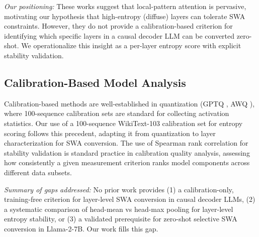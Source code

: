 \textit{Our positioning:} These works suggest that local-pattern attention is pervasive, motivating our hypothesis that high-entropy (diffuse) layers can tolerate SWA constraints. However, they do not provide a calibration-based criterion for identifying which specific layers in a causal decoder LLM can be converted zero-shot. We operationalize this insight as a per-layer entropy score with explicit stability validation.

\subsection{Calibration-Based Model Analysis}

Calibration-based methods are well-established in quantization (GPTQ \cite{Frantar2023GPTQ}, AWQ \cite{Lin2024AWQ}), where 100-sequence calibration sets are standard for collecting activation statistics. Our use of a 100-sequence WikiText-103 calibration set for entropy scoring follows this precedent, adapting it from quantization to layer characterization for SWA conversion. The use of Spearman rank correlation for stability validation is standard practice in calibration quality analysis, assessing how consistently a given measurement criterion ranks model components across different data subsets.

\textit{Summary of gaps addressed:} No prior work provides (1) a calibration-only, training-free criterion for layer-level SWA conversion in causal decoder LLMs, (2) a systematic comparison of head-mean vs head-max pooling for layer-level entropy stability, or (3) a validated prerequisite for zero-shot selective SWA conversion in Llama-2-7B. Our work fills this gap.
